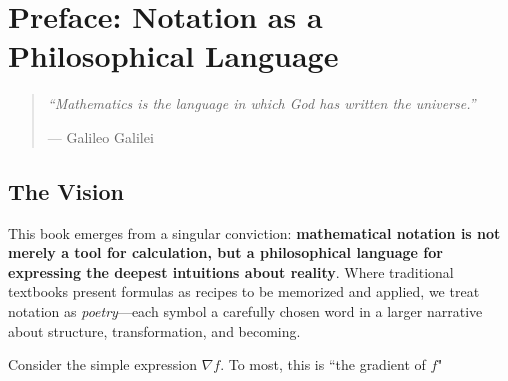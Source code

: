 \chapter*{Preface: Notation as a Philosophical Language}

\begin{quote}
	\itshape
	``Mathematics is the language in which God has written the universe.''

	\raggedleft--- Galileo Galilei
\end{quote}

\section*{The Vision}

This book emerges from a singular conviction: \textbf{mathematical notation is
	not merely a tool for calculation, but a philosophical language for expressing
	the deepest intuitions about reality}. Where traditional textbooks present
formulas as recipes to be memorized and applied, we treat notation as
\textit{poetry}---each symbol a carefully chosen word in a larger narrative
about structure, transformation, and becoming.

Consider the simple expression $\nabla f$. To most, this is ``the gradient of
$f$"
